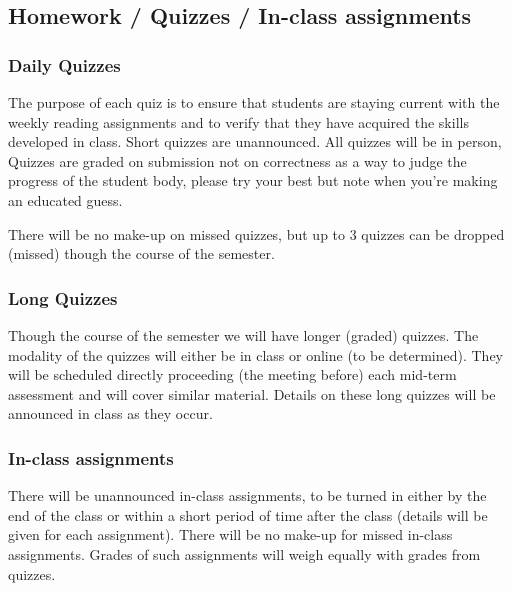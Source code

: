 \documentclass[12pt]{scrartcl}
\begin{document}
\subsection{Homework / Quizzes / In-class assignments}

\subsubsection{Daily Quizzes}
The purpose of each quiz is to ensure that students are staying current with the weekly reading assignments and to verify that they have acquired the skills developed in class. 
Short quizzes are unannounced. 
All quizzes will be in person, 
Quizzes are graded on submission not on correctness as a way to judge the progress of the student body, please try your best but note when you're making an educated guess. 

There will be no make-up on missed quizzes, but up to 3 quizzes can be dropped (missed) though the course of the semester.
 
 \subsubsection{Long Quizzes}
 Though the course of the semester we will have longer (graded) quizzes. 
 The modality of the quizzes will either be in class or online (to be determined). 
 They will be scheduled directly proceeding (the meeting before) each mid-term assessment and will cover similar material. 
 Details on these long quizzes will be announced in class as they occur. 
 
\subsubsection{In-class assignments}
There will be unannounced in-class assignments, to be turned in either by the end of the class or within a short period of time after the class (details will be given for each assignment). 
There will be no make-up for missed in-class assignments. 
Grades of such assignments will weigh equally with grades from quizzes. 
\end{document}
